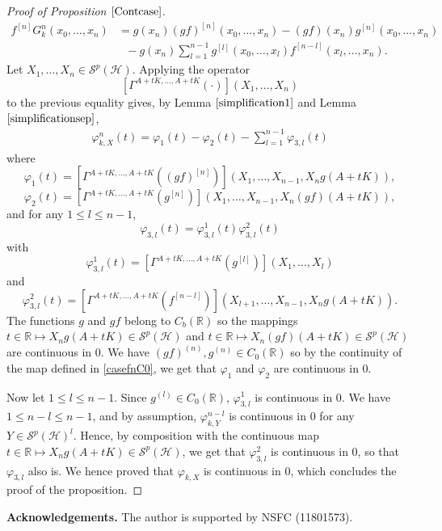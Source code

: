 \documentclass[12pt]{amsart}
\theoremstyle{remark}
\begin{document}
\begin{proof}[Proof of Proposition $\ref{Contcase}$]
\begin{align*}
f^{[n]}G_k^n(x_0, \ldots, x_n) 
& = g(x_n)(gf)^{[n]}(x_0, \ldots, x_n) - (gf)(x_n) g^{[n]}(x_0,\ldots, x_n) \\
& \ \ \ - g(x_n)\sum_{l=1}^{n-1} g^{[l]}(x_0, \ldots, x_l)f^{[n-l]}(x_{l} ,\ldots, x_n).
\end{align*}
Let $X_1, \ldots, X_n \in \mathcal{S}^p(\mathcal{H})$. Applying the operator
$$
\left[\Gamma^{A+tK, \ldots, A+tK}(\cdot)\right](X_1,\ldots, X_n)
$$
to the previous equality gives, by Lemma $\ref{simplification1}$ and Lemma $\ref{simplificationsep}$,
\begin{align*}
\varphi_{k,X}^n(t) = \varphi_1(t) - \varphi_2(t) - \sum_{l=1}^{n-1} \varphi_{3,l}(t)
\end{align*}
where
$$
\varphi_1(t) = \left[\Gamma^{A+tK, \ldots, A+tK}((gf)^{[n]})\right](X_1,\ldots, X_{n-1}, X_ng(A+tK)),
$$
$$
\varphi_2(t) = \left[\Gamma^{A+tK, \ldots, A+tK}(g^{[n]})\right](X_1,\ldots, X_{n-1}, X_n (gf)(A+tK)),
$$
and for any $1\leq l \leq n-1$,
$$
\varphi_{3,l}(t) = \varphi_{3,l}^1(t)\varphi_{3,l}^2(t)
$$
with 
$$
\varphi_{3,l}^1(t) = \left[\Gamma^{A+tK, \ldots, A+tK}(g^{[l]})\right](X_1,\ldots,X_{l})
$$
and
$$\varphi_{3,l}^2(t) = \left[\Gamma^{A+tK, \ldots, A+tK}(f^{[n-l]})\right](X_{l+1},\ldots, X_{n-1}, X_n g(A+tK)).
$$
The functions $g$ and $gf$ belong to $C_b(\mathbb{R})$ so the mappings $t \in \mathbb{R} \mapsto X_ng(A+tK) \in \mathcal{S}^p(\mathcal{H})$ and $t \in \mathbb{R} \mapsto X_n (gf)(A+tK) \in \mathcal{S}^p(\mathcal{H})$ are continuous in $0$. We have $(gf)^{(n)}, g^{(n)} \in C_0(\mathbb{R})$ so by the continuity of the map defined in \eqref{casefnC0}, we get that $\varphi_1$ and $\varphi_2$ are continuous in $0$.

Now let $1 \leq l \leq n-1$. Since $g^{(l)} \in C_0(\mathbb{R})$, $\varphi_{3,l}^1$ is continuous in $0$. We have $1 \leq n-l \leq n-1$, and by assumption, $\varphi_{k,Y}^{n-l}$ is continuous in $0$ for any $Y \in \mathcal{S}^p(\mathcal{H})^l$. Hence, by composition with the continuous map $t \in \mathbb{R} \mapsto X_ng(A+tK) \in \mathcal{S}^p(\mathcal{H})$, we get that $\varphi_{3,l}^2$ is continuous in $0$, so that $\varphi_{3,l}$ also is. We hence proved that $\varphi_{k,X}$ is continuous in $0$, which concludes the proof of the proposition.

\end{proof}




\vskip 1cm
\noindent
{\bf Acknowledgements.} The author is supported by NSFC (11801573).
\end{document}
